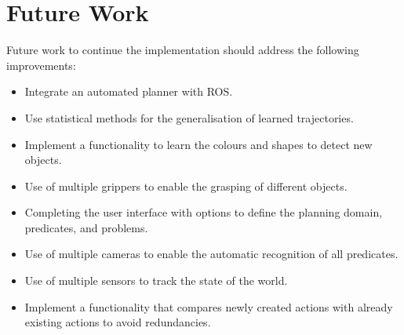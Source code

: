 \section{Future Work}
Future work to continue the implementation should address the following improvements:
\begin{itemize}
\item Integrate an automated planner with ROS.
\item Use statistical methods for the generalisation of learned trajectories.
\item Implement a functionality to learn the colours and shapes to detect new objects.
\item Use of multiple grippers to enable the grasping of different objects.
\item Completing the user interface with options to define the planning domain, predicates, and problems.
\item Use of multiple cameras to enable the automatic recognition of all predicates.
\item Use of multiple sensors to track the state of the world.
\item Implement a functionality that compares newly created actions with already existing actions to avoid redundancies.
\end{itemize}
